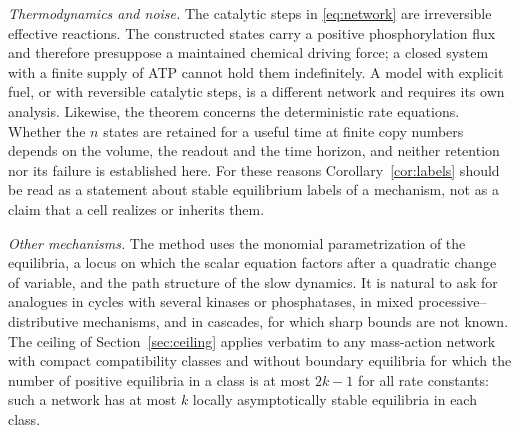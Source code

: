 \emph{Thermodynamics and noise.} The catalytic steps in \eqref{eq:network} are irreversible
effective reactions. The constructed states carry a positive phosphorylation flux and
therefore presuppose a maintained chemical driving force; a closed system with a finite supply
of ATP cannot hold them indefinitely. A model with explicit fuel, or with reversible catalytic
steps, is a different network and requires its own analysis. Likewise, the theorem concerns
the deterministic rate equations. Whether the \(n\) states are retained for a useful time at
finite copy numbers depends on the volume, the readout and the time horizon, and neither
retention nor its failure is established here. For these reasons Corollary~\ref{cor:labels}
should be read as a statement about stable equilibrium labels of a mechanism, not as a claim
that a cell realizes or inherits them.

\emph{Other mechanisms.} The method uses the monomial parametrization of the equilibria, a
locus on which the scalar equation factors after a quadratic change of variable, and the path
structure of the slow dynamics. It is natural to ask for analogues in cycles with several
kinases or phosphatases, in mixed processive--distributive mechanisms, and in cascades, for
which sharp bounds are not known. The ceiling of Section~\ref{sec:ceiling} applies verbatim to
any mass-action network with compact compatibility classes and without boundary equilibria
for which the number of positive equilibria in a class is at most \(2k-1\) for all rate
constants: such a network has at most \(k\) locally asymptotically stable equilibria in each
class.
